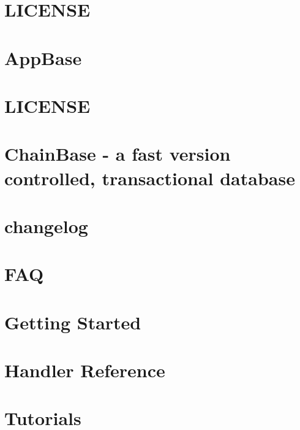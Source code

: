 \documentclass[twoside]{book}
\newcommand{\+}{\discretionary{\mbox{\scriptsize$\hookleftarrow$}}{}{}}
\begin{document}
\chapter{L\+I\+C\+E\+N\+SE}
\label{md_libraries_appbase__l_i_c_e_n_s_e}

\chapter{App\+Base}
\label{md_libraries_appbase__r_e_a_d_m_e}

\chapter{L\+I\+C\+E\+N\+SE}
\label{md_libraries_chainbase__l_i_c_e_n_s_e}

\chapter{Chain\+Base -\/ a fast version controlled, transactional database}
\label{md_libraries_chainbase__r_e_a_d_m_e}

\chapter{changelog}
\label{md_libraries_fc_vendor_websocketpp_changelog}

\chapter{F\+AQ}
\label{faq}

\chapter{Getting Started}
\label{getting_started}

\chapter{Handler Reference}
\label{reference_8handlers}

\chapter{Tutorials}
\label{tutorials}

\end{document}
